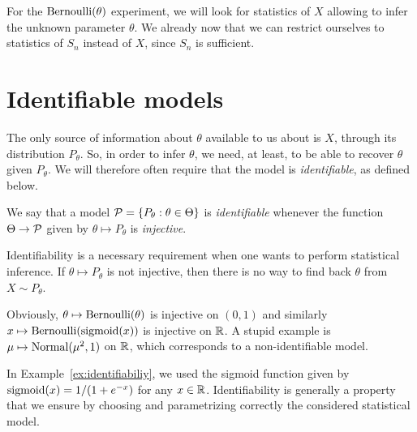 For the $\operatorname{Bernoulli}(\theta)$ experiment, we will look for statistics of $X$ allowing to infer the unknown parameter $\theta$.
We already now that we can restrict ourselves to statistics of $S_n$ instead of $X$, since $S_n$ is  sufficient.

\section{Identifiable models} %

The only source of information about $\theta$ available to us about is $X$, through its distribution $P_{\theta}$.
So, in order to infer $\theta$, we need, at least, to be able to recover $\theta$ given $P_\theta$.
We will therefore often require that the model is \emph{identifiable}, as defined below.
\begin{definition}
	We say that a model $\operatorname{{\mathcal P}} = \{ P_\theta : \theta \in \Theta \}$ is \emph{identifiable} whenever the function $\Theta \rightarrow \operatorname{{\mathcal P}}$ given by $\theta \mapsto P_\theta$
	is \emph{injective}.
\end{definition}
Identifiability is a necessary requirement when one wants to perform statistical inference.
If $\theta \mapsto P_\theta$ is not injective, then there is no way to find back $\theta$ from $X \sim P_\theta$.

\begin{example}
	\label{ex:identifiabiliy}
	Obviously, $\theta \mapsto \operatorname{Bernoulli}(\theta)$ is injective on $(0, 1)$ and similarly $x \mapsto \operatorname{Bernoulli}(\operatorname{sigmoid}(x))$ is injective on $\mathbb R$.
	A stupid example is $\mu \mapsto \operatorname{Normal}(\mu^2, 1)$ on $\mathbb R$, which corresponds to a non-identifiable model.
\end{example}
In Example~\ref{ex:identifiabiliy}, we used the sigmoid function given by $\operatorname{sigmoid}(x) = 1 / (1 + e^{-x})$ for any $x \in \mathbb R$.%
Identifiability is generally a property that we ensure by choosing and parametrizing correctly the considered statistical model.

